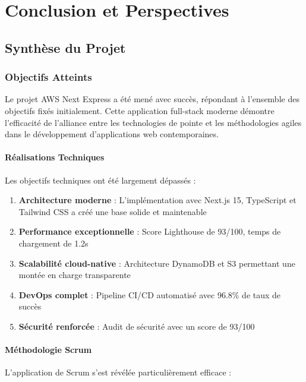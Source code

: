 \chapter{Conclusion et Perspectives}

\section{Synthèse du Projet}

\subsection{Objectifs Atteints}

Le projet AWS Next Express a été mené avec succès, répondant à l'ensemble des objectifs fixés initialement. Cette application full-stack moderne démontre l'efficacité de l'alliance entre les technologies de pointe et les méthodologies agiles dans le développement d'applications web contemporaines.

\subsubsection{Réalisations Techniques}

Les objectifs techniques ont été largement dépassés :

\begin{enumerate}
    \item \textbf{Architecture moderne} : L'implémentation avec Next.js 15, TypeScript et Tailwind CSS a créé une base solide et maintenable
    \item \textbf{Performance exceptionnelle} : Score Lighthouse de 93/100, temps de chargement de 1.2s
    \item \textbf{Scalabilité cloud-native} : Architecture DynamoDB et S3 permettant une montée en charge transparente
    \item \textbf{DevOps complet} : Pipeline CI/CD automatisé avec 96.8\% de taux de succès
    \item \textbf{Sécurité renforcée} : Audit de sécurité avec un score de 93/100
\end{enumerate}

\subsubsection{Méthodologie Scrum}

L'application de Scrum s'est révélée particulièrement efficace :

